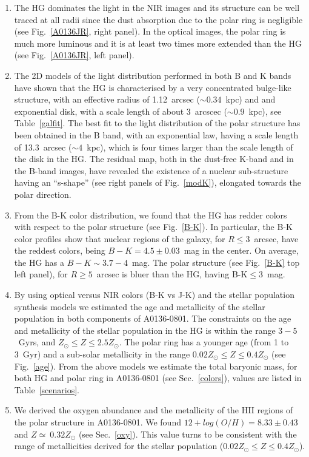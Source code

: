 \documentclass[useAMS,usenatbib]{mn2e}
\begin{document}
\begin{enumerate}

\item The HG dominates the light in the NIR images and its structure
  can be well traced at all radii since the dust absorption due to the
  polar ring is negligible (see Fig.~\ref{A0136JR}, right panel). In
  the optical images, the polar ring is much more luminous and it is
  at least two times more extended than the HG (see
  Fig.~\ref{A0136JR}, left panel).

\item The 2D models of the light distribution performed in both B and
  K bands have shown that the HG is characterised by a very
  concentrated bulge-like structure, with an effective radius of
  1.12~arcsec ($\sim0.34$~kpc) and and exponential disk, with a scale
  length of about 3~arcscec ($\sim0.9$~kpc), see
  Table~\ref{galfit}. The best fit to the light distribution of the
  polar structure has been obtained in the B band, with an exponential
  law, having a scale length of 13.3~arcsec ($\sim4$~kpc), which is
  four times larger than the scale length of the disk in the HG.  The
  residual map, both in the dust-free K-band and in the B-band images,
  have revealed the existence of a nuclear sub-structure having an
  ``s-shape'' (see right panels of Fig.~\ref{modK}),
  elongated towards the polar direction.

\item From the B-K color distribution, we found that the HG
  has redder colors with respect to the polar structure (see
  Fig.~\ref{B-K}). In particular, the B-K color profiles show that
  nuclear regions of the galaxy, for $R \le 3$~arcsec, have the
  reddest colors, being $B-K=4.5\pm 0.03$~mag in the center. On
  average, the HG has a $B-K \sim 3.7-4$~mag. The polar structure (see
  Fig.~\ref{B-K} top left panel), for $R \ge 5$~arcsec is bluer than
  the HG, having B-K$\le 3$~mag.

\item By using optical versus NIR colors (B-K vs J-K) and the stellar
  population synthesis models we estimated the age and metallicity of
  the stellar population in both components of A0136-0801. The
  constraints on the age and metallicity of the stellar population in
  the HG is within the range $3-5$~Gyrs, and $Z_{\odot} \le Z \le 2.5
  Z_{\odot}$. The polar ring has a younger age (from 1 to 3~Gyr) and a
  sub-solar metallicity in the range $0.02Z_{\odot} \le Z \le
  0.4Z_{\odot}$ (see Fig.~\ref{age}). From the above models we
  estimate the total baryonic mass, for both HG and polar ring in
  A0136-0801 (see Sec.~\ref{colors}), values are listed in
  Table~\ref{scenarios}.

\item We derived the oxygen abundance and the metallicity of the HII
  regions of the polar structure in A0136-0801.  We found $12+log(O/H)
  = 8.33 \pm 0.43$ and $Z \simeq\ 0.32 Z_{\odot}$ (see
  Sec.~\ref{oxy}). This value turns to be consistent with the range of
  metallicities derived for the stellar population ($0.02Z_{\odot} \le
  Z \le 0.4Z_{\odot}$).

\end{enumerate}
\end{document}
